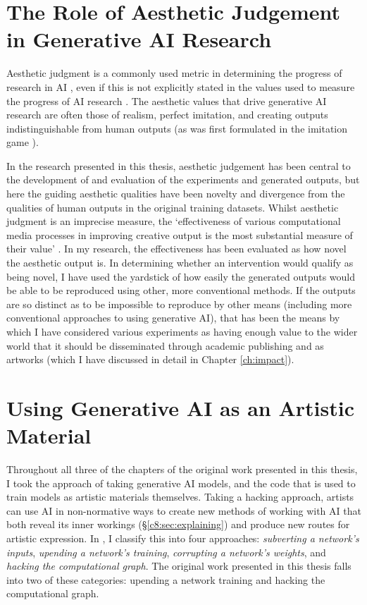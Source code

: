 \section{The Role of Aesthetic Judgement in Generative AI Research}
\label{c8:sec:aesthetic}

Aesthetic judgment is a commonly used metric in determining the progress of research in AI \citep{stanley2018art}, even if this is not explicitly stated in the values used to measure the progress of AI research \citep{birhane2022values}.
The aesthetic values that drive generative AI research are often those of realism, perfect imitation, and creating outputs indistinguishable from human outputs (as was first formulated in the imitation game \citep{machinery1950computing}). 

In the research presented in this thesis, aesthetic judgement has been central to the development of and evaluation of the experiments and generated outputs, but here the guiding aesthetic qualities have been novelty and divergence from the qualities of human outputs in the original training datasets.
Whilst aesthetic judgment is an imprecise measure, the `effectiveness of various computational media processes in improving creative output is the most substantial measure of their value' \citep{brown2009integrating}. 
In my research, the effectiveness has been evaluated as how novel the aesthetic output is. 
In determining whether an intervention would qualify as being novel, I have used the yardstick of how easily the generated outputs would be able to be reproduced using other, more conventional methods.
If the outputs are so distinct as to be impossible to reproduce by other means (including more conventional approaches to using generative AI), that has been the means by which I have considered various experiments as having enough value to the wider world that it should be disseminated through academic publishing and as artworks (which I have discussed in detail in Chapter \ref{ch:impact}).

\section{Using Generative AI as an Artistic Material}
\label{c8:sec:material}
Throughout all three of the chapters of the original work presented in this thesis, I took the approach of taking generative AI models, and the code that is used to train models as artistic materials themselves.
Taking a hacking approach, artists can use AI in non-normative ways to create new methods of working with AI that both reveal its inner workings (\S \ref{c8:sec:explaining}) and produce new routes for artistic expression. 
In \citep{broad2024using}, I classify this into four approaches: \textit{subverting a network's inputs}, \textit{upending a network's training}, \textit{corrupting a network's weights}, and \textit{hacking the computational graph}. 
The original work presented in this thesis falls into two of these categories: upending a network training and hacking the computational graph.

